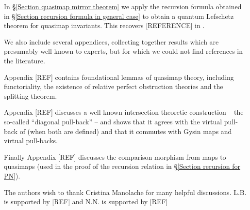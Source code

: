In \S \ref{Section quasimap mirror theorem} we apply the recursion formula obtained in \S \ref{Section recursion formula in general case} to obtain a quantum Lefschetz theorem for quasimap invariants. This recovers [REFERENCE] in \cite{CF-K-wallcrossing}.

We also include several appendices, collecting together results which are presumably well-known to experts, but for which we could not find references in the literature.

Appendix [REF] contains foundational lemmas of quasimap theory, including functoriality, the existence of relative perfect obstruction theories and the splitting theorem.

Appendix [REF] discusses a well-known intersection-theoretic construction -- the so-called ``diagonal pull-back'' -- and shows that it agrees with the virtual pull-back of \cite{Manolache-Pull} (when both are defined) and that it commutes with Gysin maps and virtual pull-backs.

Finally Appendix [REF] discusses the comparison morphism from maps to quasimaps (used in the proof of the recursion relation in \S \ref{Section recursion for PN}).

\begin{acknowledgements} The authors wish to thank Cristina Manolache for many helpful discussions. L.B. is supported by [REF] and N.N. is supported by [REF]
\end{acknowledgements}

